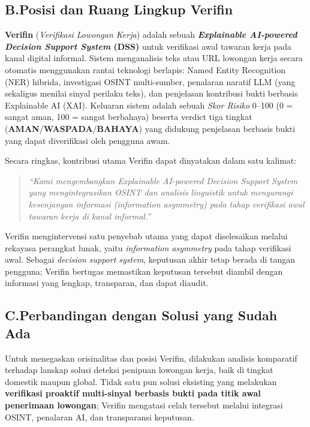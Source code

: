 \documentclass[12pt,a4paper]{article}
\begin{document}
\subsection*{B.\quad Posisi dan Ruang Lingkup Verifin}

\textbf{Verifin} (\textit{Verifikasi Lowongan Kerja}) adalah sebuah \textbf{\textit{Explainable
AI-powered Decision Support System} (DSS)} untuk verifikasi awal tawaran kerja pada kanal digital
informal. Sistem menganalisis teks atau URL lowongan kerja secara otomatis menggunakan rantai
teknologi berlapis: Named Entity Recognition (NER) hibrida, investigasi
OSINT multi-sumber, penalaran naratif LLM (yang sekaligus menilai sinyal perilaku teks), dan
penjelasan kontribusi bukti berbasis Explainable
AI (XAI).
Keluaran sistem adalah sebuah \textit{Skor Risiko} 0--100 (0 = sangat aman, 100 = sangat berbahaya)
beserta verdict tiga tingkat (\textbf{AMAN}/\textbf{WASPADA}/\textbf{BAHAYA}) yang didukung penjelasan berbasis bukti yang
dapat diverifikasi oleh pengguna awam.

Secara ringkas, kontribusi utama Verifin dapat dinyatakan dalam satu kalimat:

\begin{quote}
\itshape ``Kami mengembangkan \textit{Explainable AI-powered Decision Support System} yang
mengintegrasikan OSINT dan analisis linguistik untuk mengurangi kesenjangan informasi
(\textit{information asymmetry}) pada tahap verifikasi awal tawaran kerja di kanal informal.''
\end{quote}

Verifin mengintervensi satu penyebab utama yang dapat diselesaikan melalui
rekayasa perangkat lunak, yaitu \textit{information asymmetry} pada tahap verifikasi awal. Sebagai
\textit{decision support system}, keputusan akhir tetap berada di tangan pengguna; Verifin
bertugas memastikan keputusan tersebut diambil dengan informasi yang lengkap, transparan, dan
dapat diaudit.

\subsection*{C.\quad Perbandingan dengan Solusi yang Sudah Ada}

Untuk menegaskan orisinalitas dan posisi Verifin, dilakukan analisis komparatif terhadap lanskap solusi deteksi penipuan lowongan kerja, baik di tingkat domestik maupun global. Tidak satu pun solusi eksisting yang melakukan \textbf{verifikasi proaktif multi-sinyal berbasis bukti pada titik awal penerimaan lowongan}; Verifin mengatasi celah tersebut melalui integrasi OSINT, penalaran AI, dan transparansi keputusan.
\end{document}
